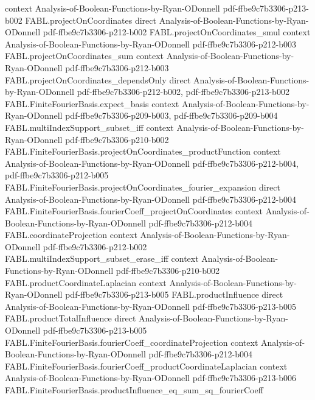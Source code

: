 \begin{theorem}
  {context}
  {Analysis-of-Boolean-Functions-by-Ryan-ODonnell}
  {pdf-ffbe9c7b3306-p213-b002}
\proofstep
  {FABL.projectOnCoordinates}
  {direct}
  {Analysis-of-Boolean-Functions-by-Ryan-ODonnell}
  {pdf-ffbe9c7b3306-p212-b002}
\proofstep
  {FABL.projectOnCoordinates_smul}
  {context}
  {Analysis-of-Boolean-Functions-by-Ryan-ODonnell}
  {pdf-ffbe9c7b3306-p212-b003}
\proofstep
  {FABL.projectOnCoordinates_sum}
  {context}
  {Analysis-of-Boolean-Functions-by-Ryan-ODonnell}
  {pdf-ffbe9c7b3306-p212-b003}
\proofstep
  {FABL.projectOnCoordinates_dependsOnly}
  {direct}
  {Analysis-of-Boolean-Functions-by-Ryan-ODonnell}
  {pdf-ffbe9c7b3306-p212-b002,
    pdf-ffbe9c7b3306-p213-b002}
\proofstep
  {FABL.FiniteFourierBasis.expect_basis}
  {context}
  {Analysis-of-Boolean-Functions-by-Ryan-ODonnell}
  {pdf-ffbe9c7b3306-p209-b003,
    pdf-ffbe9c7b3306-p209-b004}
\proofstep
  {FABL.multiIndexSupport_subset_iff}
  {context}
  {Analysis-of-Boolean-Functions-by-Ryan-ODonnell}
  {pdf-ffbe9c7b3306-p210-b002}
\proofstep
  {FABL.FiniteFourierBasis.projectOnCoordinates_productFunction}
  {context}
  {Analysis-of-Boolean-Functions-by-Ryan-ODonnell}
  {pdf-ffbe9c7b3306-p212-b004,
    pdf-ffbe9c7b3306-p212-b005}
\proofstep
  {FABL.FiniteFourierBasis.projectOnCoordinates_fourier_expansion}
  {direct}
  {Analysis-of-Boolean-Functions-by-Ryan-ODonnell}
  {pdf-ffbe9c7b3306-p212-b004}
\proofstep
  {FABL.FiniteFourierBasis.fourierCoeff_projectOnCoordinates}
  {context}
  {Analysis-of-Boolean-Functions-by-Ryan-ODonnell}
  {pdf-ffbe9c7b3306-p212-b004}
\proofstep
  {FABL.coordinateProjection}
  {context}
  {Analysis-of-Boolean-Functions-by-Ryan-ODonnell}
  {pdf-ffbe9c7b3306-p212-b002}
\proofstep
  {FABL.multiIndexSupport_subset_erase_iff}
  {context}
  {Analysis-of-Boolean-Functions-by-Ryan-ODonnell}
  {pdf-ffbe9c7b3306-p210-b002}
\proofstep
  {FABL.productCoordinateLaplacian}
  {context}
  {Analysis-of-Boolean-Functions-by-Ryan-ODonnell}
  {pdf-ffbe9c7b3306-p213-b005}
\proofstep
  {FABL.productInfluence}
  {direct}
  {Analysis-of-Boolean-Functions-by-Ryan-ODonnell}
  {pdf-ffbe9c7b3306-p213-b005}
\proofstep
  {FABL.productTotalInfluence}
  {direct}
  {Analysis-of-Boolean-Functions-by-Ryan-ODonnell}
  {pdf-ffbe9c7b3306-p213-b005}
\proofstep
  {FABL.FiniteFourierBasis.fourierCoeff_coordinateProjection}
  {context}
  {Analysis-of-Boolean-Functions-by-Ryan-ODonnell}
  {pdf-ffbe9c7b3306-p212-b004}
\proofstep
  {FABL.FiniteFourierBasis.fourierCoeff_productCoordinateLaplacian}
  {context}
  {Analysis-of-Boolean-Functions-by-Ryan-ODonnell}
  {pdf-ffbe9c7b3306-p213-b006}
\proofstep
  {FABL.FiniteFourierBasis.productInfluence_eq_sum_sq_fourierCoeff}

\end{theorem}
